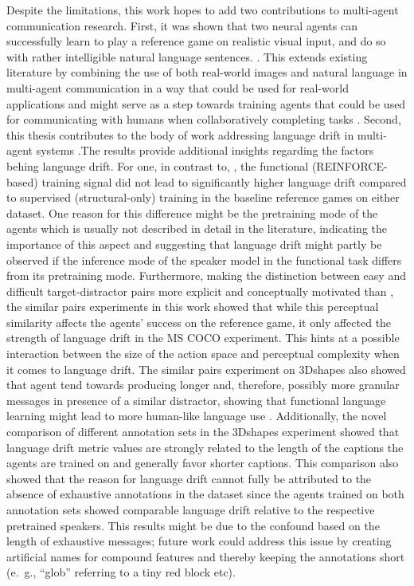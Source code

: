 Despite the limitations, this work hopes to add two contributions to multi-agent communication research. First, it was shown that two neural agents can successfully learn to play a reference game on realistic visual input, and do so with rather intelligible natural language sentences. . 
This extends existing literature by combining the use of both real-world images and natural language in multi-agent communication in a way that could be used for real-world applications and might serve as a step towards training agents that could be used for communicating with humans when collaboratively completing tasks \parencite{lazaridou2020emergent, havrylov2017emergence, lazaridou2016multi, andreas2016reasoning, cohn2018pragmatically}. 
Second, this thesis contributes to the body of work addressing language drift in multi-agent systems \parencite[e.~g.,][]{lewis2017deal, lee2019countering, lazaridou2020multi}.The results provide additional insights regarding the factors behing language drift. For one, in contrast to, \cite[e.~g.,][]{lewis2017deal, lee2019countering}, the functional (REINFORCE-based) training signal did not lead to significantly higher language drift compared to supervised (structural-only) training in the baseline reference games on either dataset. One reason for this difference might be the pretraining mode of the agents which is usually not described in detail in the literature, indicating the importance of this aspect and suggesting that language drift might partly be observed if the inference mode of the speaker model in the functional task differs from its pretraining mode. Furthermore, making the distinction between easy and difficult target-distractor pairs more explicit and conceptually motivated than \cite{lazaridou2020multi}, the similar pairs experiments in this work showed that while this perceptual similarity affects the agents' success on the reference game, it only affected the strength of language drift in the MS COCO experiment. This hints at a possible interaction between the size of the action space and perceptual complexity when it comes to language drift. The similar pairs experiment on 3Dshapes also showed that agent tend towards producing longer and, therefore, possibly more granular messages in presence of a similar distractor, showing that functional language learning might lead to more human-like language use \parencite[cf.][]{graf2016animal}.
Additionally, the novel comparison of different annotation sets in the 3Dshapes experiment showed that language drift metric values are strongly related to the length of the captions the agents are trained on and generally favor shorter captions. This comparison also showed that the reason for language drift cannot fully be attributed to the absence of exhaustive annotations in the dataset since the agents trained on both annotation sets showed comparable language drift relative to the respective pretrained speakers. This results might be due to the confound based on the length of exhaustive messages; future work could address this issue by creating artificial names for compound features and thereby keeping the annotations short (e.~g., ``glob'' referring to a tiny red block etc).
